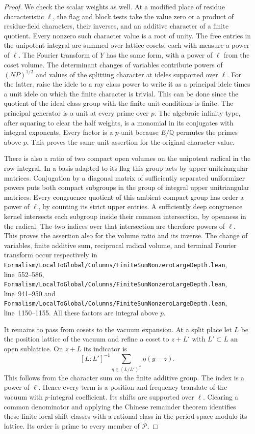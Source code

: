 \documentclass[a4paper,11pt]{article}
\theoremstyle{definition}
\theoremstyle{remark}
\newcommand{\srcloc}[2]{{\small\nolinkurl{#1.lean}}, line~#2}
\numberwithin{equation}{section}
\begin{document}
\begin{proof}
We check the scalar weights as well. At a modified place of
residue characteristic \(\ell\), the flag and block tests take the
value zero or a product of residue-field characters, their inverses,
and an additive character of a finite quotient. Every nonzero
such character value is a root of unity. The free entries
in the unipotent integral are summed over lattice cosets, each
with measure a power of \(\ell\). The Fourier transform of \(Y\)
has the same form, with a power of \(\ell\) from the coset volume.
The determinant changes of variables contribute powers of
\((NP)^{1/2}\) and values of the splitting character at
ideles supported over \(\ell\). For the latter, raise the idele
to a ray class power to write it as a principal idele times a
unit idele on which the finite character is trivial. This
can be done since the quotient of the ideal class group with
the finite unit conditions is finite. The principal generator
is a unit at every prime over \(p\). The algebraic infinity type,
after squaring to clear the half weights, is a monomial in its
conjugates with integral exponents. Every factor is a \(p\)-unit
because \(E/\mathbb Q\) permutes the primes above \(p\). This
proves the same unit assertion for the original character value.

There is also a ratio of two compact open volumes on the
unipotent radical in the row integral. In a basis adapted to its
flag this group acts by upper unitriangular matrices. Conjugation
by a diagonal matrix of sufficiently separated uniformizer
powers puts both compact subgroups in the group of integral
upper unitriangular matrices. Every congruence quotient of this
ambient compact group has order a power of \(\ell\), by counting
its strict upper entries. A sufficiently deep congruence kernel
intersects each subgroup inside their common intersection, by
openness in the radical. The two indices over that intersection
are therefore powers of \(\ell\). This proves the assertion also
for the volume ratio and its inverse. The change of variables,
finite additive sum, reciprocal radical volume, and terminal
Fourier transform occur respectively in
\srcloc{Formalism/LocalToGlobal/Columns/FiniteSumNonzeroLargeDepth}{552--586},
\srcloc{Formalism/LocalToGlobal/Columns/FiniteSumNonzeroLargeDepth}{941--950}
and \srcloc{Formalism/LocalToGlobal/Columns/FiniteSumNonzeroLargeDepth}{1150--1155}.
All these factors are integral above \(p\).

It remains to pass from cosets to the vacuum expansion. At a
split place let \(L\) be the position lattice of the vacuum and
refine a coset to \(z+L'\) with \(L'\subset L\) an open sublattice.
On \(z+L\) its indicator is
\[
      [L:L']^{-1}\sum_{\eta\in(L/L')^\vee}\eta(y-z).
\]
This follows from the character sum on the finite additive
group. The index is a power of \(\ell\). Hence every term is a
position and frequency translate of the vacuum with
\(p\)-integral coefficient. Its shifts are supported over
\(\ell\). Clearing a common denominator and applying the Chinese
remainder theorem identifies these finite local shift classes
with a rational class in the period space modulo its lattice.
Its order is prime to every member of \(\mathcal P\).


\end{proof}
\end{document}
